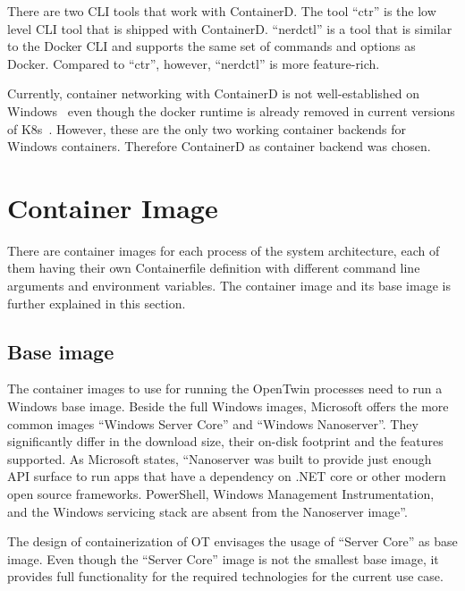 There are two \ac{CLI} tools that work with ContainerD. The tool \enquote{ctr} is the low level \ac{CLI} tool that is shipped with ContainerD.  \enquote{nerdctl} is a tool that is similar to the Docker \ac{CLI}  and supports the same set of commands and options as Docker. Compared to \enquote{ctr}, however, \enquote{nerdctl} is more feature-rich.



Currently, container networking with ContainerD is not well-established on \ac{Windows}~\cite{GitHub.20230202,GitHub.20230202b,Github.2022_258,GitHub.20230202c} even though the docker runtime is already removed in current versions of \ac{K8s}~\cite{Kubernetes.2020}. However, these are the only two working container backends for \ac{Windows} containers. Therefore ContainerD as container backend was chosen.



\section{Container Image}
There are container images for each process of the system architecture, each of them having their own Containerfile definition with different command line arguments and environment variables.
The container image and its base image is further explained in this section.

\subsection{Base image}
The container images to use for running the OpenTwin processes need to run a \ac{Windows} base image. Beside the full \ac{Windows} images, Microsoft offers the more common images \enquote{\ac{Windows} Server Core} and \enquote{\ac{Windows} Nanoserver}\cite{MattbriggsMicrosoft.20230214}. They significantly differ in the download size, their on-disk footprint and the features supported\cite{MattbriggsMicrosoft.20230214}. As Microsoft states, \enquote{Nanoserver was built to provide just enough \ac{API} surface to run apps that have a dependency on .NET core or other modern open source frameworks. PowerShell, Windows Management Instrumentation, and the \ac{Windows} servicing stack are absent from the Nanoserver image}\cite{MattbriggsMicrosoft.20230214}.

The design of containerization of \ac{OT} envisages the usage of \enquote{Server Core} as base image. Even though the \enquote{Server Core} image is not the smallest base image, it provides full functionality for the required technologies for the current use case.

